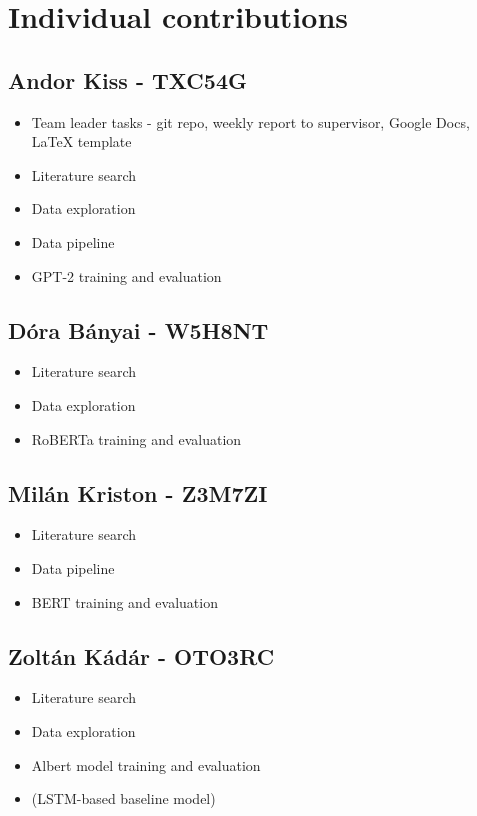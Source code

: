 \documentclass[runningheads]{llncs}
\begin{document}
\section{Individual contributions}

\subsection{Andor Kiss - TXC54G}

\begin{itemize}
  \item Team leader tasks - git repo, weekly report to supervisor, Google Docs, LaTeX template
  \item Literature search
  \item Data exploration
  \item Data pipeline
  \item GPT-2 training and evaluation
\end{itemize}

\subsection{Dóra Bányai - W5H8NT}

\begin{itemize}
  \item Literature search
  \item Data exploration
  \item RoBERTa training and evaluation
\end{itemize}

\subsection{Milán Kriston - Z3M7ZI}

\begin{itemize}
  \item Literature search
  \item Data pipeline
  \item BERT training and evaluation
\end{itemize}

\subsection{Zoltán Kádár - OTO3RC}

\begin{itemize}
  \item Literature search
  \item Data exploration
  \item Albert model training and evaluation
  \item (LSTM-based baseline model)
\end{itemize}
\end{document}

